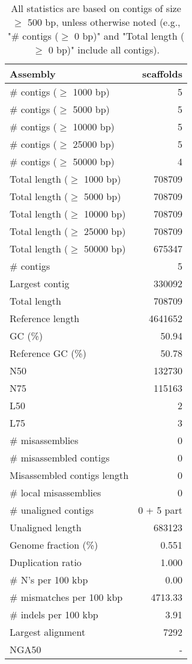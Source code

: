 \documentclass[12pt,a4paper]{article}
\begin{document}
\begin{table}[ht]
\begin{center}
\caption{All statistics are based on contigs of size $\geq$ 500 bp, unless otherwise noted (e.g., "\# contigs ($\geq$ 0 bp)" and "Total length ($\geq$ 0 bp)" include all contigs).}
\begin{tabular}{|l*{1}{|r}|}
\hline
Assembly & scaffolds \\ \hline
\# contigs ($\geq$ 1000 bp) & 5 \\ \hline
\# contigs ($\geq$ 5000 bp) & 5 \\ \hline
\# contigs ($\geq$ 10000 bp) & 5 \\ \hline
\# contigs ($\geq$ 25000 bp) & 5 \\ \hline
\# contigs ($\geq$ 50000 bp) & 4 \\ \hline
Total length ($\geq$ 1000 bp) & 708709 \\ \hline
Total length ($\geq$ 5000 bp) & 708709 \\ \hline
Total length ($\geq$ 10000 bp) & 708709 \\ \hline
Total length ($\geq$ 25000 bp) & 708709 \\ \hline
Total length ($\geq$ 50000 bp) & 675347 \\ \hline
\# contigs & 5 \\ \hline
Largest contig & 330092 \\ \hline
Total length & 708709 \\ \hline
Reference length & 4641652 \\ \hline
GC (\%) & 50.94 \\ \hline
Reference GC (\%) & 50.78 \\ \hline
N50 & 132730 \\ \hline
N75 & 115163 \\ \hline
L50 & 2 \\ \hline
L75 & 3 \\ \hline
\# misassemblies & 0 \\ \hline
\# misassembled contigs & 0 \\ \hline
Misassembled contigs length & 0 \\ \hline
\# local misassemblies & 0 \\ \hline
\# unaligned contigs & 0 + 5 part \\ \hline
Unaligned length & 683123 \\ \hline
Genome fraction (\%) & 0.551 \\ \hline
Duplication ratio & 1.000 \\ \hline
\# N's per 100 kbp & 0.00 \\ \hline
\# mismatches per 100 kbp & 4713.33 \\ \hline
\# indels per 100 kbp & 3.91 \\ \hline
Largest alignment & 7292 \\ \hline
NGA50 & - \\ \hline
\end{tabular}
\end{center}
\end{table}
\end{document}
